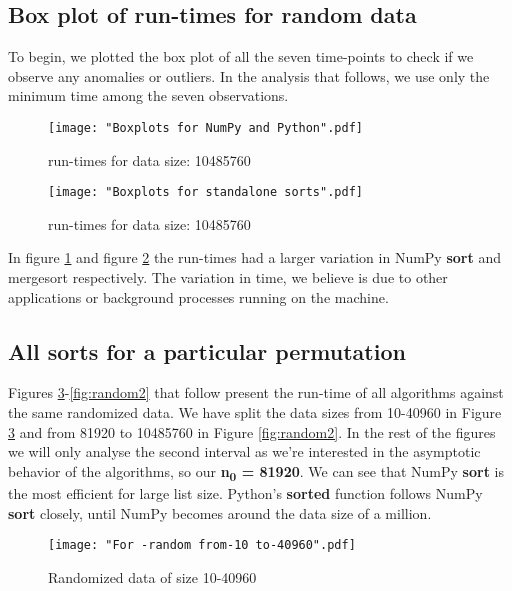 \documentclass[sigconf, nonacm, natbib, screen, balance=False]{acmart}
\begin{document}
\subsection{Box plot of run-times for random data }\label{scatter}
To begin, we plotted the box plot of all the seven time-points to check if we observe any anomalies or outliers. In the analysis that follows, we use only the minimum time among the seven observations.

\begin{figure}[ht]
\texttt{[image: "Boxplots for NumPy and Python".pdf]}
    \caption{run-times for data size: 10485760 }
    \label{fig:box1}
\end{figure}

\begin{figure}[ht]
\texttt{[image: "Boxplots for standalone sorts".pdf]}
    \caption{run-times for data size: 10485760  }
    \label{fig:box2}
\end{figure}

In figure \ref{fig:box1} and figure \ref{fig:box2} the run-times had a larger variation in NumPy \textbf{sort} and mergesort respectively. The variation in time, we believe is due to other applications or background processes running on the machine.

\subsection{All sorts for a particular permutation }\label{allsorts}

Figures \ref{fig:random1}-\ref{fig:random2} that follow present the run-time of all algorithms against the same randomized data. We have split the data sizes from 10-40960 in Figure \ref{fig:random1} and from 81920 to 10485760 in Figure \ref{fig:random2}. In the rest of the figures we will only analyse the second interval as we're interested in the asymptotic behavior of the algorithms, so our \textbf{n\textsubscript{0} = 81920}.\newline
We can see that NumPy \textbf{sort} is the most efficient for large list size. Python's \textbf{sorted} function follows NumPy \textbf{sort} closely, until NumPy becomes around the data size of a million.\newline

\begin{figure}[ht]
\texttt{[image: "For -random from-10 to-40960".pdf]}
    \caption{Randomized data of size 10-40960 }
    \label{fig:random1}
\end{figure}
\end{document}
